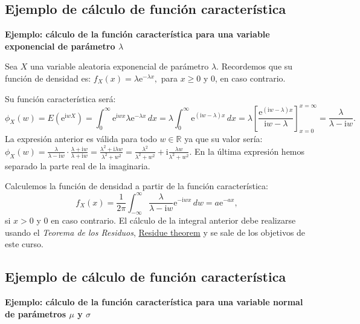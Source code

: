 \documentclass[]{book}
\begin{document}
\hypertarget{ejemplo-de-cuxe1lculo-de-funciuxf3n-caracteruxedstica-1}{%
\subsection{Ejemplo de cálculo de función característica}\label{ejemplo-de-cuxe1lculo-de-funciuxf3n-caracteruxedstica-1}}

\textbf{Ejemplo: cálculo de la función característica para una variable exponencial de parámetro \(\lambda\)}

Sea \(X\) una variable aleatoria exponencial de parámetro \(\lambda\). Recordemos que su función de densidad es: \(f_X(x)=\lambda \mathrm{e}^{-\lambda x},\) para \(x\geq 0\) y \(0\), en caso contrario.

Su función característica será:
\[
\phi_X (w)=E\left(\mathrm{e}^{\mathrm{i}wX}\right)=\int_0^\infty \mathrm{e}^{\mathrm{i}w x}\lambda \mathrm{e}^{-\lambda x}\, dx = \lambda \int_0^\infty\mathrm{e}^{(\mathrm{i}w-\lambda)x}\, dx = \lambda\left[\frac{\mathrm{e}^{(\mathrm{i}w-\lambda)x}}{\mathrm{i}w-\lambda}\right]_{x=0}^{x=\infty} = \frac{\lambda}{\lambda -\mathrm{i} w}. 
\]
La expresión anterior es válida para todo \(w\in\mathbb{R}\) ya que su valor sería:
\(\phi_X (w)=\frac{\lambda}{\lambda -\mathrm{i} w}\cdot \frac{\lambda +\mathrm{i} w}{\lambda +\mathrm{i} w}=\frac{\lambda^2+\mathrm{i}\lambda w}{\lambda^2+w^2}=\frac{\lambda^2}{\lambda^2+w^2}+\mathrm{i}\frac{\lambda w}{\lambda^2+w^2}.\)
En la última expresión hemos separado la parte real de la imaginaria.

Calculemos la función de densidad a partir de la función característica:
\[
f_X(x)=\frac{1}{2\pi}\int_{-\infty}^\infty \frac{\lambda}{\lambda -\mathrm{i} w}\mathrm{e}^{-\mathrm{i}wx}\, dw = a\mathrm{e}^{-a x},
\]
si \(x>0\) y \(0\) en caso contrario. El cálculo de la integral anterior debe realizarse usando el \emph{Teorema de los Residuos}, \href{https://en.wikipedia.org/wiki/Residue_theorem}{Residue theorem} y se sale de los objetivos de este curso.

\hypertarget{ejemplo-de-cuxe1lculo-de-funciuxf3n-caracteruxedstica-2}{%
\subsection{Ejemplo de cálculo de función característica}\label{ejemplo-de-cuxe1lculo-de-funciuxf3n-caracteruxedstica-2}}

\textbf{Ejemplo: cálculo de la función característica para una variable normal de parámetros \(\mu\) y \(\sigma\)}
\end{document}

